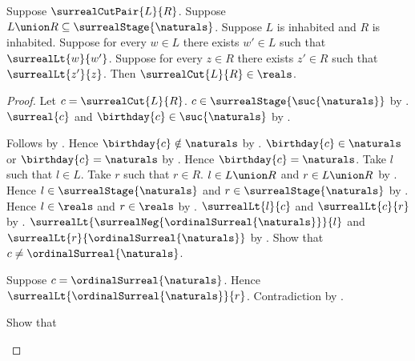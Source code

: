 \begin{theorem}\label{dense_finite_stage_surreal_cut_is_real}
    Suppose $\surrealCutPair{L}{R}$.
    Suppose $L\union R\subseteq\surrealStage{\naturals}$.
    Suppose $L$ is inhabited and $R$ is inhabited.
    Suppose for every $w\in L$ there exists $w'\in L$ such that
        $\surrealLt{w}{w'}$.
    Suppose for every $z\in R$ there exists $z'\in R$ such that
        $\surrealLt{z'}{z}$.
    Then $\surrealCut{L}{R}\in\reals$.
\end{theorem}
\begin{proof}
    Let $c=\surrealCut{L}{R}$.
    $c\in\surrealStage{\suc{\naturals}}$
        by .
    $\surreal{c}$ and $\birthday{c}\in\suc{\naturals}$
        by
        .
    \begin{byCase}
            Follows by .
            Hence $\birthday{c}\notin\naturals$
                by
                .
            $\birthday{c}\in\naturals$ or
                $\birthday{c}=\naturals$ by .
            Hence $\birthday{c}=\naturals$.
            Take $l$ such that $l\in L$.
            Take $r$ such that $r\in R$.
            $l\in L\union R$ and $r\in L\union R$
                by .
            Hence $l\in\surrealStage{\naturals}$ and
                $r\in\surrealStage{\naturals}$ by .
            Hence $l\in\reals$ and $r\in\reals$
                by .
            $\surrealLt{l}{c}$ and $\surrealLt{c}{r}$
                by .
            $\surrealLt
                {\surrealNeg{\ordinalSurreal{\naturals}}}{l}$ and
                $\surrealLt{r}{\ordinalSurreal{\naturals}}$
                by .
            Show that $c\neq\ordinalSurreal{\naturals}$.
            \begin{subproof}
                Suppose $c=\ordinalSurreal{\naturals}$.
                Hence
                    $\surrealLt{\ordinalSurreal{\naturals}}{r}$.
                Contradiction by
                    .
            \end{subproof}
            Show that

\end{byCase}
\end{proof}
